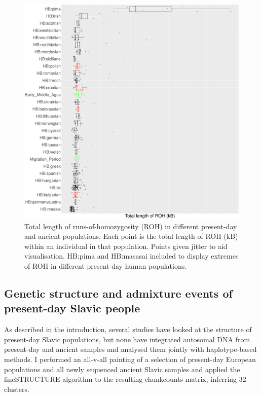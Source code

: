 \begin{figure}[htp]
    \centering
    \includegraphics[width=1.0\textwidth]{../images/chapter5/ROH_plot.pdf}
    \caption{Total length of runs-of-homozygosity (ROH) in different present-day and ancient populations. Each point is the total length of ROH (kB) within an individual in that population. Points given jitter to aid visualisation. HB:pima and HB:masasai included to display extremes of ROH in different present-day human populations.}
    \label{fig:ROH}
\end{figure} 

\subsection{Genetic structure and admixture events of present-day Slavic people}

As described in the introduction, several studies have looked at the structure of present-day Slavic populations, but none have integrated autosomal DNA from present-day and ancient samples and analysed them jointly with haplotype-based methods. I performed an all-v-all painting of a selection of present-day European populations and all newly sequenced ancient Slavic samples and applied the fineSTRUCTURE algorithm to the resulting chunkcounts matrix, inferring 32 clusters.


